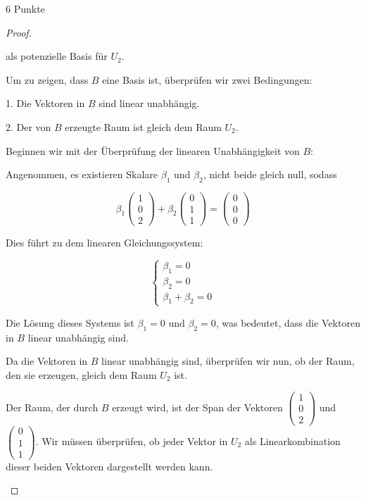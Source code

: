 \documentclass{problemset}
\begin{document}
\begin{problem}{6 Punkte}
\begin{proof}
\begin{enumerate}
              als potenzielle Basis für $U_2$.

              Um zu zeigen, dass $B$ eine Basis ist, überprüfen wir zwei Bedingungen:

              1. Die Vektoren in $B$ sind linear unabhängig.

              2. Der von $B$ erzeugte Raum ist gleich dem Raum $U_2$.

              Beginnen wir mit der Überprüfung der linearen Unabhängigkeit von $B$:

              Angenommen, es existieren Skalare $\beta_1$ und $\beta_2$, nicht beide gleich
              null, sodass

              \[
                  \beta_1 \begin{pmatrix} 1 \\ 0 \\ 2 \end{pmatrix} + \beta_2 \begin{pmatrix} 0 \\ 1 \\ 1 \end{pmatrix} = \begin{pmatrix} 0 \\ 0 \\ 0 \end{pmatrix}
              \]

              Dies führt zu dem linearen Gleichungssystem:

              \[
                  \begin{cases}
                      \beta_1 = 0 \\
                      \beta_2 = 0 \\
                      \beta_1 + \beta_2 = 0
                  \end{cases}
              \]

              Die Lösung dieses Systems ist $\beta_1 = 0$ und $\beta_2 = 0$, was bedeutet,
              dass die Vektoren in $B$ linear unabhängig sind.

              Da die Vektoren in $B$ linear unabhängig sind, überprüfen wir nun, ob der Raum,
              den sie erzeugen, gleich dem Raum $U_2$ ist.

              Der Raum, der durch $B$ erzeugt wird, ist der Span der Vektoren $\begin{pmatrix} 1 \\ 0 \\ 2 \end{pmatrix}$ und $\begin{pmatrix} 0 \\ 1 \\ 1 \end{pmatrix}$. Wir müssen überprüfen, ob jeder Vektor in $U_2$ als Linearkombination dieser beiden Vektoren dargestellt werden kann.


\end{enumerate}
\end{proof}
\end{problem}
\end{document}
